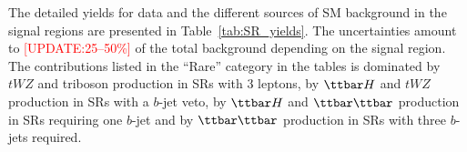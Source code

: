 The detailed yields for data and the different sources of SM background in the signal regions 
are presented in Table~\ref{tab:SR_yields}. 
The uncertainties amount to \textcolor{red}{[UPDATE:25--50\%]} of the total background depending on the signal region. 
The contributions listed in the ``Rare'' category in the tables is dominated by $tWZ$ and triboson production in SRs with 3 leptons,
by $\ttbar H$ and $tWZ$ production in SRs with a $b$-jet veto, 
by $\ttbar H$ and $\ttbar \ttbar$ production in SRs requiring one $b$-jet 
and by $\ttbar \ttbar$  production in SRs with three $b$-jets required.


